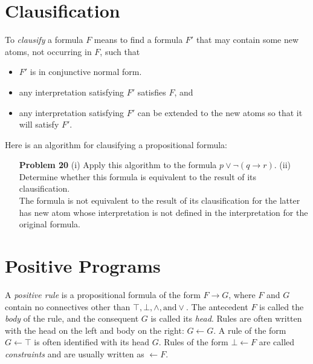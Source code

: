 \documentclass[12pt]{article}
\begin{document}
\section*{Clausification \colorbox{yellow}{}}
To \textit{clausify} a formula $F$ means to find a formula 
$F'$ that may contain some new atoms, not occurring in $F$, such that
\begin{itemize}
\item $F'$ is in conjunctive normal form. 
\item any interpretation satisfying $F'$ satisfies $F$, and 
\item any interpretation satisfying $F'$ can be extended to the new atoms so that it will satisfy $F'$. 
\end{itemize}
Here is an algorithm for clausifying a propositional formula: \\
\begin{algorithm}[H]
\end{algorithm}

\begin{enumerate}
\item[\textbf{Problem 20}] (i) Apply this algorithm to the formula $p \vee \neg (q \rightarrow r)$. (ii) Determine whether this formula is equivalent to the result of its clausification. \\
The formula is not equivalent to the result of its clausification for the latter has new atom whose interpretation is not defined in the interpretation for the original formula. 
\end{enumerate}
\newpage

\section*{Positive Programs \colorbox{yellow}{}}
A \textit{positive rule} is a propositional formula of the form $F \rightarrow G$, where $F$ and $G$ contain no connectives other than $\top, \bot, \wedge, \text{and} \vee$. The antecedent $F$ is called the \textit{body} of the rule, and the consequent $G$ is called its \textit{head}. Rules are often written with the head on the left and body on the right: $G \leftarrow G$. A rule of the form $G \leftarrow \top$ is often identified with its head $G$. Rules of the form $\bot \leftarrow F$ are called \textit{constraints} and are usually written as $\leftarrow F$. 
\end{document}
